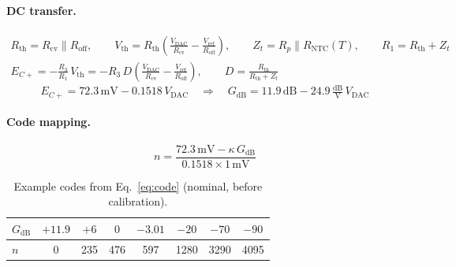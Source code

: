 \documentclass[11pt, letterpaper,titlepage]{article}
\begin{document}
\paragraph{DC transfer.}
\begin{gather}
    R_\text{th} = R_\text{cv} \parallel R_\text{off}, \qquad
    V_\text{th} = R_\text{th}\left(\frac{V_\text{DAC}}{R_\text{cv}} - \frac{V_\text{ref}}{R_\text{off}}\right), \qquad
    Z_t = R_p \parallel R_\text{NTC}(T), \qquad
    R_1 = R_\text{th} + Z_t
    \label{eq:thevenin}\\
    E_{C+} = -\frac{R_3}{R_1}\,V_\text{th}
    = -R_3\,D\left(\frac{V_\text{DAC}}{R_\text{cv}} - \frac{V_\text{ref}}{R_\text{off}}\right), \qquad
    D = \frac{R_\text{th}}{R_\text{th}+Z_t}
    \label{eq:cv-dc}
\end{gather}
\begin{equation}
    E_{C+} = 72.3\,\mathrm{mV} - 0.1518\,V_\text{DAC}
    \quad\Longrightarrow\quad
    G_\text{dB} = 11.9\,\mathrm{dB} - 24.9\,\tfrac{\mathrm{dB}}{\mathrm{V}}\,V_\text{DAC}
    \label{eq:cv-numeric}
\end{equation}

\paragraph{Code mapping.}
\begin{equation}
    n = \frac{72.3\,\mathrm{mV} - \kappa\,G_\text{dB}}{0.1518 \times 1\,\mathrm{mV}}
    \label{eq:code}
\end{equation}

\begin{table}[H]
    \centering
    \begin{tabular}{@{}lccccccc@{}}
        \toprule
        $G_\text{dB}$ & $+11.9$ & $+6$ & $0$ & $-3.01$ & $-20$ & $-70$ & $-90$ \\
        \midrule
        $n$ & 0 & 235 & 476 & 597 & 1280 & 3290 & 4095 \\
        \bottomrule
    \end{tabular}
    \caption{Example codes from Eq.~\eqref{eq:code} (nominal, before calibration).}
    \label{tab:codes}
\end{table}
\end{document}
